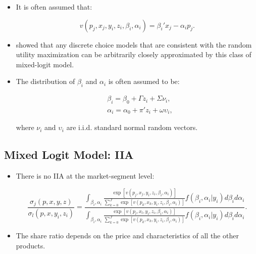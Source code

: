 \documentclass[]{book}
\providecommand{\tightlist}{%
  \setlength{\itemsep}{0pt}\setlength{\parskip}{0pt}}
\begin{document}
\begin{itemize}
\tightlist
\item
  It is often assumed that:

  \begin{equation}
  v(p_j, x_j, y_i, z_i, \beta_i, \alpha_i) = \beta_i' x_j - \alpha_i p_j.
  \end{equation}
\item
  \citet{Mcfadden2000} showed that any discrete choice models that are
  consistent with the random utility maximization can be arbitrarily
  closely approximated by this class of mixed-logit model.
\item
  The distribution of \(\beta_i\) and \(\alpha_i\) is often assumed to
  be:

  \begin{equation}
  \begin{split}
  &\beta_i = \beta_0 + \Gamma z_i + \Sigma \nu_i,\\
  &\alpha_i = \alpha_0 + \pi' z_i + \omega \upsilon_i,
  \end{split}
  \end{equation}

  where \(\nu_i\) and \(\upsilon_i\) are i.i.d. standard normal random
  vectors.
\end{itemize}

\subsection{Mixed Logit Model: IIA}\label{mixed-logit-model-iia}

\begin{itemize}
\tightlist
\item
  There is no IIA at the market-segment level:

  \begin{equation}
  \frac{\sigma_{j}(p, x, y, z)}{\sigma_{l}(p, x, y_i, z_i)} = \frac{\int_{\beta_i, \alpha_i} \frac{\exp[v(p_j, x_j, y_i, z_i, \beta_i, \alpha_i)]}{\sum_{k = 0}^J \exp[v(p_k, x_k, y_i, z_i, \beta_i, \alpha_i)]} f(\beta_i, \alpha_i|y_i) d\beta_i d\alpha_i}{\int_{\beta_i, \alpha_i} \frac{\exp[v(p_l, x_l, y_i, z_i, \beta_i, \alpha_i)]}{\sum_{k = 0}^J \exp[v(p_k, x_k, y_i, z_i, \beta_i, \alpha_i)]} f(\beta_i, \alpha_i|y_i) d\beta_i d\alpha_i}.
  \end{equation}
\item
  The share ratio depends on the price and characteristics of all the
  other products.
\end{itemize}
\end{document}

